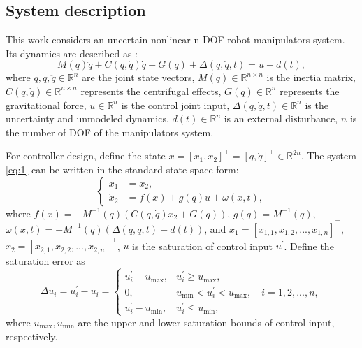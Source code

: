 \documentclass[pdflatex,sn-mathphys-num]{sn-jnl}%
\theoremstyle{thmstyleone}%
\theoremstyle{thmstyletwo}%
\theoremstyle{thmstylethree}%
\begin{document}
\subsection{System description}
\par This work considers an uncertain nonlinear n-DOF robot manipulators system. Its dynamics are described as \cite{SciaviccoSiciliano_2012_ModellingControl,BagheriEtAl_2019_Feedbacklinearization}:
\begin{equation}
	M(q)\ddot{q} + C(q, \dot{q})\dot{q} + G(q)+ \Delta(q, \dot{q}, t)= u + d(t),
	\label{eq:1}
\end{equation}
where $ q, \dot{q}, \ddot{q} \in \mathbb{R}^n $ are the joint state vectors, $M(q) \in \mathbb{R}^{n\times n}$ is the inertia matrix, $C(q, \dot{q}) \in \mathbb{R}^{n\times n} $ represents the centrifugal effects, $G(q) \in \mathbb{R}^n $ represents the gravitational force, $u \in \mathbb{R}^n$ is the control joint input, $\Delta(q, \dot{q}, t) \in \mathbb{R}^n$ is the uncertainty and unmodeled dynamics, $d(t) \in \mathbb{R}^n$ is an external disturbance, $n$ is the number of DOF of the manipulators system.

For controller design, define the state $x = [x_1,x_2]^{\top} = [q,\dot{q}]^{\top} \in \mathbb{R}^{2n}$. The system \cref{eq:1} can be written in the standard state space form:
\begin{equation}
	\left\{
	\begin{aligned}
		\dot{x}_1 & = x_2,     \\
		\dot{x}_2 & =f(x) +g(q) u +\omega(x,t),
	\end{aligned}
	\right.
	\label{eq:2}
\end{equation}
where $f(x)=-M^{-1}(q) (C(q,\dot{q})x_2 + G(q)) $, $g(q)=M^{-1}(q)$, $\omega(x,t)=-M^{-1}(q)(\Delta(q,\dot{q},t)-d(t))$, and $x_1=[x_{1,1},x_{1,2},...,x_{1,n}]^{\top}$, $x_2=[x_{2,1},x_{2,2},...,x_{2,n}]^{\top}$, $u$ is the saturation of control input $u^{\prime}$. Define the saturation error as
\begin{equation}\label{eq:3}
\Delta u_{i} =  u^{\prime}_i-u_i=\begin{cases} 
	u^{\prime}_i-u_{\max}, & u^{\prime}_i \geq u_{\max}, \\
0,       & u_{\min} < u^{\prime}_i < u_{\max},  \quad i=1,2,...,n,\\
u^{\prime}_i-u_{\min}, & u^{\prime}_i \leq u_{\min},
\end{cases}
\end{equation}
where $u_{\max},u_{\min}$ are the upper and lower saturation bounds of control input, respectively.
\end{document}
